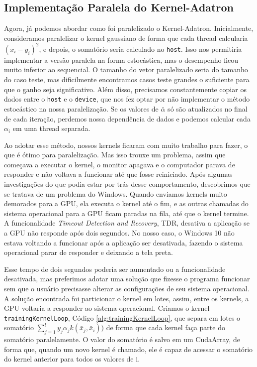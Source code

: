 \subsection{Implementação Paralela do Kernel-Adatron}
Agora, já podemos abordar como foi paralelizado o Kernel-Adatron.
Inicialmente, consideramos paralelizar o kernel gaussiano de forma que cada thread calcularia $(x_i-y_i)^2$, e depois, o somatório seria calculado no \texttt{host}. Isso nos permitiria implementar a versão paralela na forma estocástica, mas o desempenho ficou muito inferior ao sequencial. O tamanho do vetor paralelizado seria do tamanho do caso teste, mas dificilmente encontramos casos teste grandes o suficiente para que o ganho seja significativo. Além disso, precisamos constantemente copiar os dados entre o \texttt{host} e o \texttt{device}, que nos fez optar por não implementar o método estocástico na nossa paralelização. Se os valores de $\bar{\alpha}$ só são atualizados no final de cada iteração, perdemos nossa dependência de dados e podemos calcular cada $\alpha_i$ em uma thread separada.

Ao adotar esse método, nossos kernels ficaram com muito trabalho para fazer, o que é ótimo para paralelização.
Mas isso trouxe um problema, assim que começava a executar o kernel, o monitor apagava e o computador parava de responder e não voltava a funcionar até que fosse reiniciado. Após algumas investigações do que podia estar por trás desse comportamento, descobrimos que se tratava de um problema do Windows. 
Quando enviamos kernels muito demorados para a GPU, ela executa o kernel até o fim, e as outras chamadas do sistema operacional para a GPU ficam paradas na fila, até que o kernel termine.
A funcionalidade \emph{Timeout Detection and Recovery}, TDR, desativa a aplicação se a GPU não responde após dois segundos. No nosso caso, o Windows 10 não estava voltando a funcionar após a aplicação ser desativada, fazendo o sistema operacional parar de responder e deixando a tela preta.

Esse tempo de dois segundos poderia ser aumentado ou a funcionalidade desativada, mas preferimos adotar uma solução que fizesse o programa funcionar sem que o usuário precisasse alterar as configurações de seu sistema operacional. A solução encontrada foi particionar o kernel em lotes, assim, entre os kernels, a GPU voltaria a responder ao sistema operacional. Criamos o kernel \texttt{trainingKernelLoop}, Código \ref{alg:trainingKernelLoop}, que separa em lotes o somatório $\sum_{j=1}^l y_j \alpha_j k(\bar{x}_j,\bar{x}_i))$ de forma que cada kernel faça parte do somatório paralelamente. O valor do somatório é salvo em um CudaArray, de forma que, quando um novo kernel é chamado, ele é capaz de acessar o somatório do kernel anterior para todos os valores de i.

